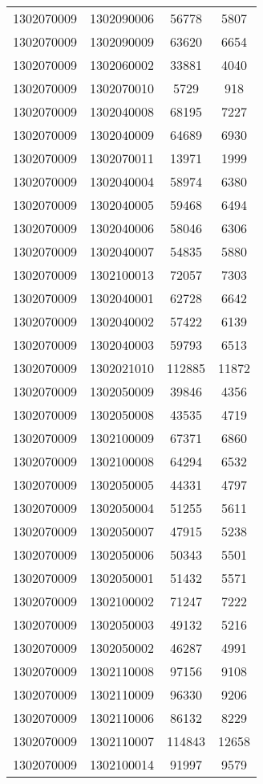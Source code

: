 \begin{longtable}{llcc}
1302070009 & 1302090006 & 56778 & 5807\\
1302070009 & 1302090009 & 63620 & 6654\\
1302070009 & 1302060002 & 33881 & 4040\\
1302070009 & 1302070010 & 5729 & 918\\
1302070009 & 1302040008 & 68195 & 7227\\
1302070009 & 1302040009 & 64689 & 6930\\
1302070009 & 1302070011 & 13971 & 1999\\
1302070009 & 1302040004 & 58974 & 6380\\
1302070009 & 1302040005 & 59468 & 6494\\
1302070009 & 1302040006 & 58046 & 6306\\
1302070009 & 1302040007 & 54835 & 5880\\
1302070009 & 1302100013 & 72057 & 7303\\
1302070009 & 1302040001 & 62728 & 6642\\
1302070009 & 1302040002 & 57422 & 6139\\
1302070009 & 1302040003 & 59793 & 6513\\
1302070009 & 1302021010 & 112885 & 11872\\
1302070009 & 1302050009 & 39846 & 4356\\
1302070009 & 1302050008 & 43535 & 4719\\
1302070009 & 1302100009 & 67371 & 6860\\
1302070009 & 1302100008 & 64294 & 6532\\
1302070009 & 1302050005 & 44331 & 4797\\
1302070009 & 1302050004 & 51255 & 5611\\
1302070009 & 1302050007 & 47915 & 5238\\
1302070009 & 1302050006 & 50343 & 5501\\
1302070009 & 1302050001 & 51432 & 5571\\
1302070009 & 1302100002 & 71247 & 7222\\
1302070009 & 1302050003 & 49132 & 5216\\
1302070009 & 1302050002 & 46287 & 4991\\
1302070009 & 1302110008 & 97156 & 9108\\
1302070009 & 1302110009 & 96330 & 9206\\
1302070009 & 1302110006 & 86132 & 8229\\
1302070009 & 1302110007 & 114843 & 12658\\
1302070009 & 1302100014 & 91997 & 9579\\

\end{longtable}
